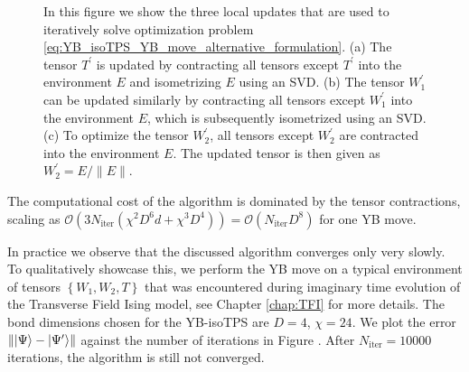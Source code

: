 \begin{figure}
\begin{subfigure}[c]{0.85\textwidth}
		\caption{}\label{fig:YB_move_iterate_polar_optimize_W2}
	\end{subfigure}%
	\caption{In this figure we show the three local updates that are used to iteratively solve optimization problem \eqref{eq:YB_isoTPS_YB_move_alternative_formulation}. (a) The tensor $T^\prime$ is updated by contracting all tensors except $T^\prime$ into the environment $E$ and isometrizing $E$ using an SVD. (b) The tensor $W_1^\prime$ can be updated similarly by contracting all tensors except $W_1^\prime$ into the environment $E$, which is subsequently isometrized using an SVD. (c) To optimize the tensor $W_2^\prime$, all tensors except $W_2^\prime$ are contracted into the environment $E$. The updated tensor is then given as $W_2^\prime = E/\lVert E\rVert$.}
	\label{fig:YB_move_iterate_polar}
\end{figure}
The computational cost of the algorithm is dominated by the tensor contractions, scaling as $\mathcal{O}(3N_\text{iter}(\chi^2D^6d + \chi^3D^4)) = \mathcal{O}(N_\text{iter}D^8)$ for one YB move.\par

In practice we observe that the discussed algorithm converges only very slowly. To qualitatively showcase this, we perform the YB move on a typical environment of tensors $\left\{W_1, W_2, T\right\}$ that was encountered during imaginary time evolution of the Transverse Field Ising model, see Chapter \ref{chap:TFI} for more details. The bond dimensions chosen for the YB-isoTPS are $D = 4$, $\chi = 24$. We plot the error $\lVert\ket{\Psi}-\ket{\Psi^\prime}\rVert$ against the number of iterations in Figure . After $N_\text{iter}=10000$ iterations, the algorithm is still not converged.